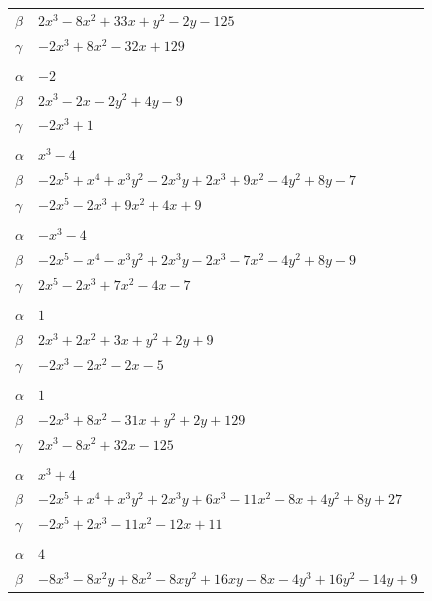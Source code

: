 \documentclass[11pt]{article}
\begin{document}
\begin{longtable}{@{}ll@{}}
$\beta$ & $2x^{3}-8x^{2}+33x+y^{2}-2y-125$\\
$\gamma$ & $-2x^{3}+8x^{2}-32x+129$\\
\addlinespace[3pt]
\multicolumn{2}{@{}l}{$\{i,j\}=\{8,16\}$, $k_{ij}=2^{2}\cdot 3$}\\
$\alpha$ & $-2$\\
$\beta$ & $2x^{3}-2x-2y^{2}+4y-9$\\
$\gamma$ & $-2x^{3}+1$\\
\addlinespace[3pt]
\multicolumn{2}{@{}l}{$\{i,j\}=\{8,21\}$, $k_{ij}=3\cdot 5$}\\
$\alpha$ & $x^{3}-4$\\
$\beta$ & $-2x^{5}+x^{4}+x^{3}y^{2}-2x^{3}y+2x^{3}+9x^{2}-4y^{2}+8y-7$\\
$\gamma$ & $-2x^{5}-2x^{3}+9x^{2}+4x+9$\\
\addlinespace[3pt]
\multicolumn{2}{@{}l}{$\{i,j\}=\{8,23\}$, $k_{ij}=17$}\\
$\alpha$ & $-x^{3}-4$\\
$\beta$ & $-2x^{5}-x^{4}-x^{3}y^{2}+2x^{3}y-2x^{3}-7x^{2}-4y^{2}+8y-9$\\
$\gamma$ & $2x^{5}-2x^{3}+7x^{2}-4x-7$\\
\addlinespace[3pt]
\multicolumn{2}{@{}l}{$\{i,j\}=\{9,10\}$, $k_{ij}=3\cdot 5$}\\
$\alpha$ & $1$\\
$\beta$ & $2x^{3}+2x^{2}+3x+y^{2}+2y+9$\\
$\gamma$ & $-2x^{3}-2x^{2}-2x-5$\\
\addlinespace[3pt]
\multicolumn{2}{@{}l}{$\{i,j\}=\{9,12\}$, $k_{ij}=2\cdot 3\cdot 5\cdot 17$}\\
$\alpha$ & $1$\\
$\beta$ & $-2x^{3}+8x^{2}-31x+y^{2}+2y+129$\\
$\gamma$ & $2x^{3}-8x^{2}+32x-125$\\
\addlinespace[3pt]
\multicolumn{2}{@{}l}{$\{i,j\}=\{9,20\}$, $k_{ij}=3\cdot 17$}\\
$\alpha$ & $x^{3}+4$\\
$\beta$ & $-2x^{5}+x^{4}+x^{3}y^{2}+2x^{3}y+6x^{3}-11x^{2}-8x+4y^{2}+8y+27$\\
$\gamma$ & $-2x^{5}+2x^{3}-11x^{2}-12x+11$\\
\addlinespace[3pt]
\multicolumn{2}{@{}l}{$\{i,j\}=\{10,13\}$, $k_{ij}=3^{3}$}\\
$\alpha$ & $4$\\
$\beta$ & $-8x^{3}-8x^{2}y+8x^{2}-8xy^{2}+16xy-8x-4y^{3}+16y^{2}-14y+9$\\

\end{longtable}
\end{document}
